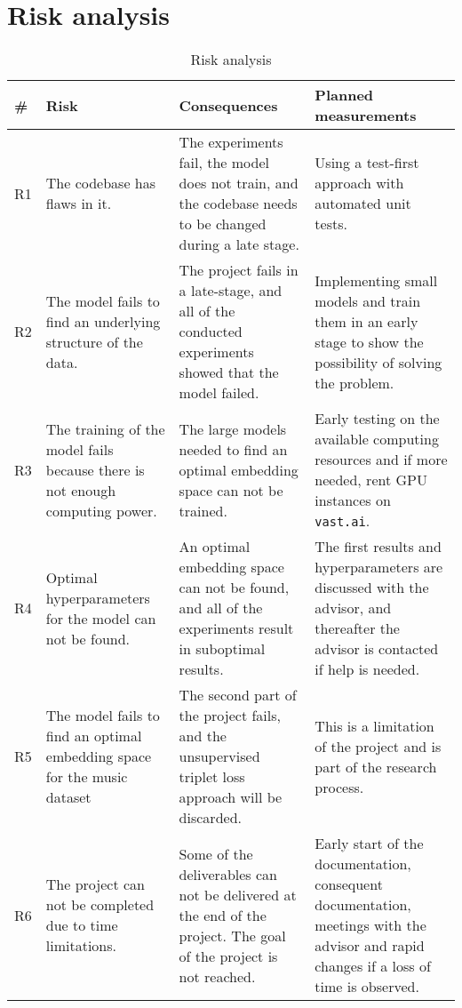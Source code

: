 \clearpage
\landscapevalues

\section{Risk analysis}
\label{sec:Risk-Analysis}
\begin{table}[htb]
    \centering
    \caption{Risk analysis}
	\label{tab:Risk-Analysis}
    \begin{tabular}{p{} | p{} | p{} | p{}}
        \toprule
        \textbf{\#} & \textbf{Risk} & \textbf{Consequences} & \textbf{Planned measurements} \\ 
        \midrule[1pt]
        R1 & The codebase has flaws in it. & The experiments fail, the model does not train, and the codebase needs to be changed during a late stage. & Using a test-first approach with automated unit tests. \\
        \hline
        R2 & The model fails to find an underlying structure of the data. & The project fails in a late-stage, and all of the conducted experiments showed that the model failed. & Implementing small models and train them in an early stage to show the possibility of solving the problem.  \\
        \hline
        R3 & The training of the model fails because there is not enough computing power. & The large models needed to find an optimal embedding space can not be trained. & Early testing on the available computing resources and if more needed, rent \gls{GPU} instances on \texttt{vast.ai}. \\
        \hline
        R4 & Optimal hyperparameters for the model can not be found. & An optimal embedding space can not be found, and all of the experiments result in suboptimal results. & The first results and hyperparameters are discussed with the advisor, and thereafter the advisor is contacted if help is needed. \\
        \hline
        R5 & The model fails to find an optimal embedding space for the music dataset & The second part of the project fails, and the unsupervised triplet loss approach will be discarded. & This is a limitation of the project and is part of the research process. \\
        \hline
        R6 & The project can not be completed due to time limitations. & Some of the deliverables can not be delivered at the end of the project. The goal of the project is not reached. & Early start of the documentation, consequent documentation, meetings with the advisor and rapid changes if a loss of time is observed. \\ 
        \bottomrule
    \end{tabular}
\end{table}
